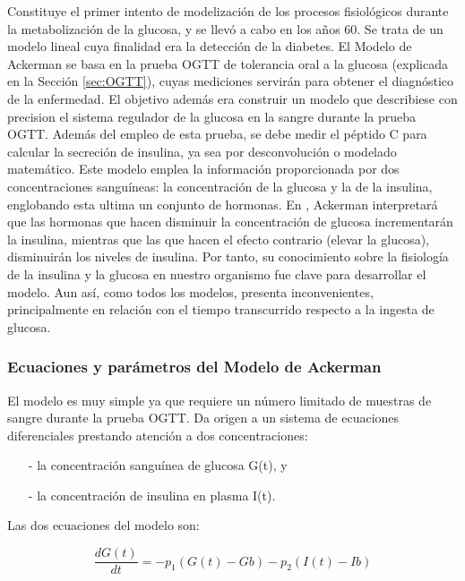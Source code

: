 Constituye el primer intento de modelización de los procesos fisiológicos durante la metabolización de la glucosa, y se llevó a cabo en los años 60. Se trata de un modelo lineal cuya finalidad era la detección de la diabetes.
El Modelo de Ackerman se basa en la prueba OGTT de tolerancia oral a la glucosa (explicada en la Sección \ref{sec:OGTT}), cuyas mediciones servirán para obtener el diagnóstico de la enfermedad. El objetivo además era construir un modelo que describiese con precision el sistema regulador de la glucosa en la sangre durante la prueba OGTT. Además del empleo de esta prueba, se debe medir el péptido C para calcular la secreción de insulina, ya sea por desconvolución o modelado matemático.
Este modelo emplea la información proporcionada por dos concentraciones sanguíneas: la concentración de la glucosa y la de la insulina, englobando esta ultima un conjunto de hormonas. En \cite{ackerman1965model}, Ackerman interpretará que las hormonas que hacen disminuir la concentración de glucosa incrementarán la insulina, mientras que las que hacen el efecto contrario (elevar la glucosa), disminuirán los niveles de insulina. Por tanto, su conocimiento sobre la fisiología de la insulina y la glucosa en nuestro organismo fue clave para desarrollar el modelo. Aun así, como todos los modelos, presenta inconvenientes, principalmente en relación con el tiempo transcurrido respecto a la ingesta de glucosa.

\subsubsection{Ecuaciones y parámetros del Modelo de Ackerman}

El modelo es muy simple ya que requiere un número limitado de muestras de sangre durante la prueba OGTT. Da origen a un sistema de ecuaciones diferenciales prestando atención a dos concentraciones:

\begin{enumerate}
    \item[-] la concentración sanguínea de glucosa G(t), y
    \item[-] la concentración de insulina en plasma I(t).
\end{enumerate}

Las dos ecuaciones del modelo son:

\begin{equation}
\frac{dG(t)}{dt} = -p_1 (G(t)-Gb)-p_2 (I(t)-Ib)
\end{equation}

